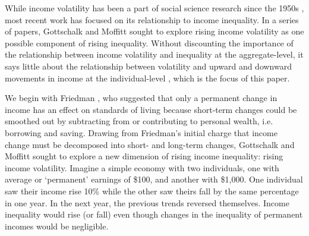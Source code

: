 \documentclass[12pt]{article}
\begin{document}
While income volatility has been a part of social science research since the 1950s \citep{friedman_1957}, most recent work has focused on its relationship to income inequality. In a series of papers, Gottschalk and Moffitt \citeyearpar{gottschalk_moffitt_1994,gottschalk_moffitt_2009,moffitt_gottschalk_2012} sought to explore rising income volatility as one possible component of rising inequality. Without discounting the importance of the relationship between income volatility and inequality at the aggregate-level, it says little about the relationship between volatility and upward and downward movements in income at the individual-level \citep{western_etal_2012}, which is the focus of this paper.

We begin with Friedman \citeyearpar{friedman_1957}, who suggested that only a permanent change in income has an effect on standards of living because short-term changes could be smoothed out by subtracting from or contributing to personal wealth, i.e. borrowing and saving. Drawing from Friedman's initial charge that income change must be decomposed into short- and long-term changes, Gottschalk and Moffitt \citeyearpar{gottschalk_moffitt_1994} sought to explore a new dimension of rising income inequality: rising income volatility. Imagine a simple economy with two individuals, one with average or `permanent' earnings of \$100, and another with \$1,000. One individual saw their income rise 10\% while the other saw theirs fall by the same percentage in one year. In the next year, the previous trends reversed themselves. Income inequality would rise (or fall) even though changes in the inequality of permanent incomes would be negligible.
\end{document}
